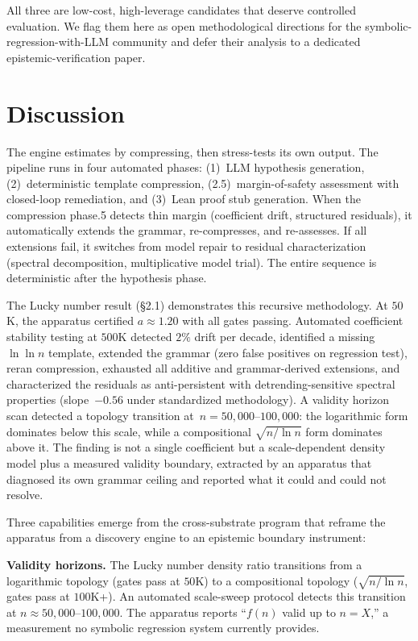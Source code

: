 \documentclass[12pt]{article}
\begin{document}
All three are low-cost, high-leverage candidates that deserve controlled evaluation. We flag them here as open methodological directions for the symbolic-regression-with-LLM community and defer their analysis to a dedicated epistemic-verification paper.

\section{Discussion}

The engine estimates by compressing, then stress-tests its own output. The pipeline runs in four automated phases: (1)~LLM hypothesis generation, (2)~deterministic template compression, (2.5)~margin-of-safety assessment with closed-loop remediation, and (3)~Lean proof stub generation. When the compression phase.5 detects thin margin (coefficient drift, structured residuals), it automatically extends the grammar, re-compresses, and re-assesses. If all extensions fail, it switches from model repair to residual characterization (spectral decomposition, multiplicative model trial). The entire sequence is deterministic after the hypothesis phase.

The Lucky number result (\S2.1) demonstrates this recursive methodology. At $50$K, the apparatus certified $a \approx 1.20$ with all gates passing. Automated coefficient stability testing at $500$K detected $2\%$ drift per decade, identified a missing $\ln\ln n$ template, extended the grammar (zero false positives on regression test), reran compression, exhausted all additive and grammar-derived extensions, and characterized the residuals as anti-persistent with detrending-sensitive spectral properties (slope~$-0.56$ under standardized methodology). A validity horizon scan detected a topology transition at~$n = 50{,}000$--$100{,}000$: the logarithmic form dominates below this scale, while a compositional $\sqrt{n/\ln n}$ form dominates above it. The finding is not a single coefficient but a scale-dependent density model plus a measured validity boundary, extracted by an apparatus that diagnosed its own grammar ceiling and reported what it could and could not resolve.

Three capabilities emerge from the cross-substrate program that reframe the apparatus from a discovery engine to an epistemic boundary instrument:

\textbf{Validity horizons.} The Lucky number density ratio transitions from a logarithmic topology (gates pass at $50$K) to a compositional topology ($\sqrt{n/\ln n}$, gates pass at $100$K+). An automated scale-sweep protocol detects this transition at $n \approx 50{,}000$--$100{,}000$. The apparatus reports ``$f(n)$ valid up to $n = X$,'' a measurement no symbolic regression system currently provides.
\end{document}
